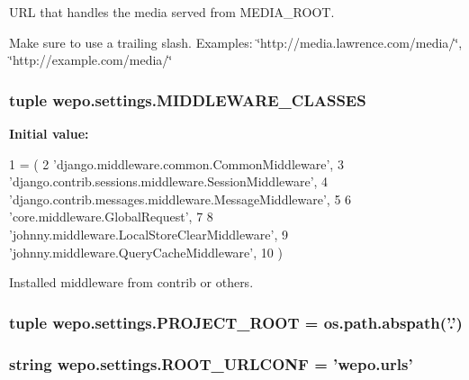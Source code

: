U\-R\-L that handles the media served from M\-E\-D\-I\-A\-\_\-\-R\-O\-O\-T. 

Make sure to use a trailing slash. Examples\-: \char`\"{}http\-://media.\-lawrence.\-com/media/\char`\"{}, \char`\"{}http\-://example.\-com/media/\char`\"{} \hypertarget{namespacewepo_1_1settings_aff501e73353b60e2ccf464b01e342bc7}{
\subsubsection[{M\-I\-D\-D\-L\-E\-W\-A\-R\-E\-\_\-\-C\-L\-A\-S\-S\-E\-S}]{\setlength{\rightskip}{0pt plus 5cm}tuple wepo.\-settings.\-M\-I\-D\-D\-L\-E\-W\-A\-R\-E\-\_\-\-C\-L\-A\-S\-S\-E\-S}}\label{namespacewepo_1_1settings_aff501e73353b60e2ccf464b01e342bc7}
{\bfseries Initial value\-:}
\begin{DoxyCode}
1 = (
2    \textcolor{stringliteral}{'django.middleware.common.CommonMiddleware'},
3    \textcolor{stringliteral}{'django.contrib.sessions.middleware.SessionMiddleware'},
4    \textcolor{stringliteral}{'django.contrib.messages.middleware.MessageMiddleware'},
5 
6    \textcolor{stringliteral}{'core.middleware.GlobalRequest'},
7 
8    \textcolor{stringliteral}{'johnny.middleware.LocalStoreClearMiddleware'},
9    \textcolor{stringliteral}{'johnny.middleware.QueryCacheMiddleware'},
10 )
\end{DoxyCode}


Installed middleware from contrib or others. 

\hypertarget{namespacewepo_1_1settings_afe30a5558df09d1195f567c20585d733}{
\subsubsection[{P\-R\-O\-J\-E\-C\-T\-\_\-\-R\-O\-O\-T}]{\setlength{\rightskip}{0pt plus 5cm}tuple wepo.\-settings.\-P\-R\-O\-J\-E\-C\-T\-\_\-\-R\-O\-O\-T = os.\-path.\-abspath('.')}}\label{namespacewepo_1_1settings_afe30a5558df09d1195f567c20585d733}
\hypertarget{namespacewepo_1_1settings_ab1e513db5bb04f174572009893ecc447}{
\subsubsection[{R\-O\-O\-T\-\_\-\-U\-R\-L\-C\-O\-N\-F}]{\setlength{\rightskip}{0pt plus 5cm}string wepo.\-settings.\-R\-O\-O\-T\-\_\-\-U\-R\-L\-C\-O\-N\-F = 'wepo.\-urls'}}\label{namespacewepo_1_1settings_ab1e513db5bb04f174572009893ecc447}


